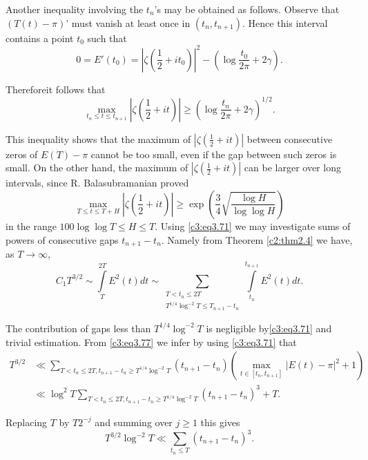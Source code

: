 Another inequality involving the $t_n$'s may be obtained as
follows. Observe that $(T(t)-\pi)$' must vanish at least once in
$(t_n, t_{n+1})$. Hence this interval contains a point $t_0$ such that
$$
0 = E' (t_0) = \left|\zeta \left( \frac{1}{2} + it_0\right)\right|^2- \left(\log \frac{t_0}{2
  \pi} + 2 \gamma \right).
$$

Therefore\pageoriginale it follows that
\begin{equation}
  \max_{t_n \leq t \leq t_{n+1}} \left|\zeta \left(\frac{1}{2} +
  it\right)\right|\geq 
  \left(\log \frac{t_n}{2 \pi} + 2 \gamma \right)^{1/2}.\label{c3:eq3.75}
\end{equation}

This inequality shows that the maximum of $|\zeta ( \frac{1}{2} + it)|$
between consecutive zeros of $E(T)- \pi$ cannot be too small, even if
the gap between such zeros is small. On the other hand, the maximum of
$|\zeta( \frac{1}{2}+ it )|$ can be larger over long intervals, since
R. Balasubramanian \cite{Balasubramanian2} proved
\begin{equation}
  \max_{T \leq t \leq T + H} \left|\zeta \left( \frac{1}{2} +
  it\right)\right| \geq \exp
  \left(\frac{3}{4} \sqrt{\frac{\log H}{\log \log H}}
  \right)\label{c3:eq3.76} 
\end{equation}
in the range $100 \log \log T \leq H \leq T$. Using \eqref{c3:eq3.71}
we may investigate sums of powers of consecutive gaps $t_{n+1}-
t_n$. Namely from Theorem \ref{c2:thm2.4} we have, as $T \to \infty$, 
\begin{equation}
  C_1 T^{3/2} \sim \int\limits_T^{2T} E^2 (t) dt \sim
  \sum_{\substack{T < t_n \leq 2T\\ T^{1/4} \log^{-2} T \leq T_{n+1} -
      t_n }} \int\limits_{t_n}^{t_{n+1}} E^2 (t) dt.\label{c3:eq3.77}
\end{equation}

The contribution of gaps less than $T^{1/4}\log^{-2} T$ is negligible
by\break \eqref{c3:eq3.71} and trivial estimation. From \eqref{c3:eq3.77} we
infer by using \eqref{c3:eq3.71} that
\begin{align*}
  T^{3/2} & \ll \sum_{T < t_n \leq 2T, t_{n+1} - t_n \geq T^{1/4}
    \log^{-2}T} (t_{n+1}- t_n) \left(\max_{t \in[t_n, t_{n+1}]} |E(t) -
  \pi|^2 +1 \right)\\
  & \ll \log^2 T \sum_{T < t_n \leq 2T, t_{n+1} - t_n \geq
    T^{1/4}\log^{-2} T}(t_{n+1}- t_n)^3 + T.
\end{align*}

Replacing $T$ by $T 2^{-j}$ and summing over $j \geq 1$ this gives
\begin{equation}
  T^{3/2} \log^{-2} T \ll \sum_{t_n \leq T} (t_{n+1} -
  t_n)^3. \label{c3:eq3.78} 
\end{equation}

